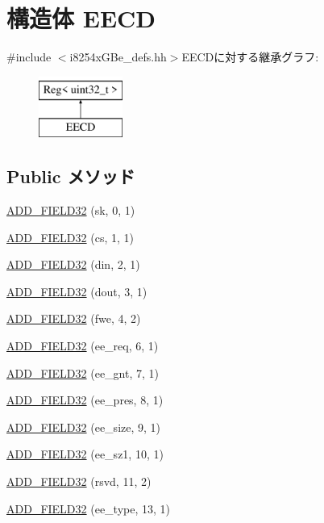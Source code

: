 \hypertarget{structiGbReg_1_1Regs_1_1EECD}{
\section{構造体 EECD}
\label{structiGbReg_1_1Regs_1_1EECD}
}


{\ttfamily \#include $<$i8254xGBe\_\-defs.hh$>$}EECDに対する継承グラフ:\begin{figure}[H]
\begin{center}
\leavevmode
\includegraphics[height=2cm]{structiGbReg_1_1Regs_1_1EECD}
\end{center}
\end{figure}
\subsection*{Public メソッド}
\begin{DoxyCompactItemize}
\item 
\hyperlink{structiGbReg_1_1Regs_1_1EECD_a90d537a0032458373eda20d497b1e86d}{ADD\_\-FIELD32} (sk, 0, 1)
\item 
\hyperlink{structiGbReg_1_1Regs_1_1EECD_afe69e407740cb74a62eacf0c713b7f6c}{ADD\_\-FIELD32} (cs, 1, 1)
\item 
\hyperlink{structiGbReg_1_1Regs_1_1EECD_a524dd5efaf07df1d10f4489aa7474d15}{ADD\_\-FIELD32} (din, 2, 1)
\item 
\hyperlink{structiGbReg_1_1Regs_1_1EECD_ac33e25accc7ac60b7062ac9018a345f2}{ADD\_\-FIELD32} (dout, 3, 1)
\item 
\hyperlink{structiGbReg_1_1Regs_1_1EECD_a997ebcf6856a9acf0e45b15cf6924acd}{ADD\_\-FIELD32} (fwe, 4, 2)
\item 
\hyperlink{structiGbReg_1_1Regs_1_1EECD_a25e3a4453cd9d41f3425a7dbb8adc709}{ADD\_\-FIELD32} (ee\_\-req, 6, 1)
\item 
\hyperlink{structiGbReg_1_1Regs_1_1EECD_a0888f8dcba4476acd50eefc4ee7d223b}{ADD\_\-FIELD32} (ee\_\-gnt, 7, 1)
\item 
\hyperlink{structiGbReg_1_1Regs_1_1EECD_a7dd49b795f2fb4caec5557677ef69d54}{ADD\_\-FIELD32} (ee\_\-pres, 8, 1)
\item 
\hyperlink{structiGbReg_1_1Regs_1_1EECD_ab2c1e76ebcc4ff73ce8e0534e6e81342}{ADD\_\-FIELD32} (ee\_\-size, 9, 1)
\item 
\hyperlink{structiGbReg_1_1Regs_1_1EECD_a4a8eb49d1bc26d5aaf1fe84e71e3a756}{ADD\_\-FIELD32} (ee\_\-sz1, 10, 1)
\item 
\hyperlink{structiGbReg_1_1Regs_1_1EECD_aa3de1aec24777a670327cabc1cd7edfb}{ADD\_\-FIELD32} (rsvd, 11, 2)
\item 
\hyperlink{structiGbReg_1_1Regs_1_1EECD_a9bfbfcd39e477f48b02001fdc08d2f1b}{ADD\_\-FIELD32} (ee\_\-type, 13, 1)
\end{DoxyCompactItemize}


